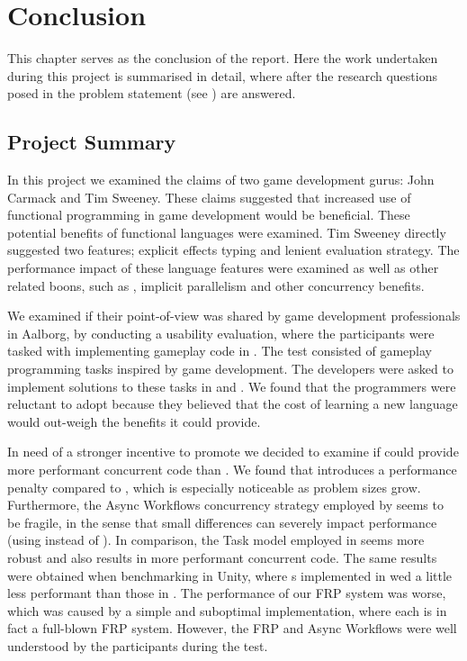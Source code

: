 \chapter{Conclusion}
This chapter serves as the conclusion of the report. Here the work undertaken during this project is summarised in detail, where after the research questions posed in the problem statement (see ) are answered.

\section{Project Summary}
In this project we examined the claims of two game development gurus: John Carmack and Tim Sweeney. These claims suggested that increased use of functional programming in game development would be beneficial. These potential benefits of functional languages were examined. Tim Sweeney directly suggested two features; explicit effects typing and lenient evaluation strategy. The performance impact of these language features were examined as well as other related boons, such as , implicit parallelism and other concurrency benefits.

We examined if their point-of-view was shared by game development professionals in Aalborg, by conducting a usability evaluation, where the participants were tasked with implementing gameplay code in \fs. The test consisted of gameplay programming tasks inspired by game development. The developers were asked to implement solutions to these tasks in \fs and \cs. We found that the programmers were reluctant to adopt \fs because they believed that the cost of learning a new language would out-weigh the benefits it could provide.

In need of a stronger incentive to promote \fs we decided to examine if \fs could provide more performant concurrent code than \cs. We found that \fs introduces a performance penalty compared to \cs, which is especially noticeable as problem sizes grow. Furthermore, the Async Workflows concurrency strategy employed by \fs seems to be fragile, in the sense that small differences can severely impact performance (using  instead of ). In comparison, the Task model employed in \cs seems more robust and also results in more performant concurrent code. The same results were obtained when benchmarking \fs in Unity, where s implemented in \fs wed a little less performant than those in \cs. The performance of our \gls{FRP} system was worse, which was caused by a simple and suboptimal implementation, where each  is in fact a full-blown \gls{FRP} system. However, the \gls{FRP} and Async Workflows were well understood by the participants during the test.

